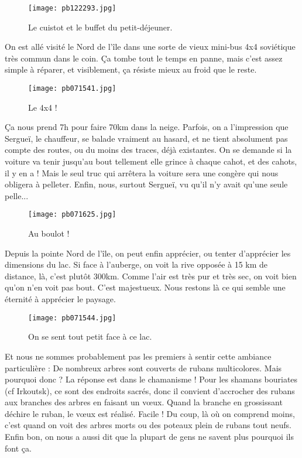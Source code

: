 \documentclass{book}
\begin{document}
\begin{figure}[h]
\centering
\texttt{[image: pb122293.jpg]}
\caption*{ Le cuistot et le buffet du petit-déjeuner.}
\end{figure}

On est allé visité le Nord de l'île dans une sorte de vieux mini-bus 4x4 soviétique très commun dans le coin. Ça tombe tout le temps en panne, mais c'est assez simple à réparer, et visiblement, ça résiste mieux au froid que le reste.


\begin{figure}[h]
\centering
\texttt{[image: pb071541.jpg]}
\caption*{ Le 4x4 !}
\end{figure}

Ça nous prend 7h pour faire 70km dans la neige. Parfois, on a l'impression que Sergueï, le chauffeur, se balade vraiment au hasard, et ne tient absolument pas compte des routes, ou du moins des traces, déjà existantes. On se demande si la voiture va tenir jusqu'au bout tellement elle grince à chaque cahot, et des cahots, il y en a ! Mais le seul truc qui arrêtera la voiture sera une congère qui nous obligera à pelleter. Enfin, nous, surtout Sergueï, vu qu'il n'y avait qu'une seule pelle...


\begin{figure}[h]
\centering
\texttt{[image: pb071625.jpg]}
\caption*{ Au boulot !}
\end{figure}

Depuis la pointe Nord de l'île, on peut enfin apprécier, ou tenter d'apprécier les dimensions du lac. Si face à l'auberge, on voit la rive opposée à 15 km de distance, là, c'est plutôt 300km. Comme l'air est très pur et très sec, on voit bien qu'on n'en voit pas bout. C'est majestueux. Nous restons là ce qui semble une éternité à apprécier le paysage.


\begin{figure}[h]
\centering
\texttt{[image: pb071544.jpg]}
\caption*{ On se sent tout petit face à ce lac.}
\end{figure}

Et nous ne sommes probablement pas les premiers à sentir cette ambiance particulière : De nombreux arbres sont couverts de rubans multicolores. Mais pourquoi donc ? La réponse est dans le chamanisme ! Pour les shamans bouriates (cf Irkoutsk), ce sont des endroits sacrés, donc il convient d'accrocher des rubans aux branches des arbres en faisant un vœux. Quand la branche en grossissant déchire le ruban, le vœux est réalisé. Facile ! Du coup, là où on comprend moins, c'est quand on voit des arbres morts ou des poteaux plein de rubans tout neufs. Enfin bon, on nous a aussi dit que la plupart de gens ne savent plus pourquoi ils font ça.
\end{document}
